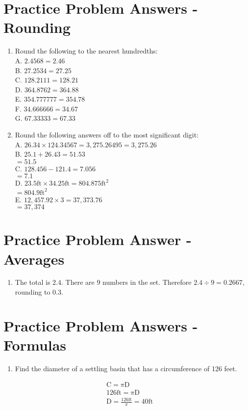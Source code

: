 \section{Practice Problem Answers - Rounding}
\begin{enumerate}
  \item Round the following to the nearest hundredths:\\
A. $2.4568=2.46$\\
B. $27.2534=27.25$\\
C. $128.2111=128.21$\\
D. $364.8762=364.88$\\
E. $354.777777=354.78$\\
F. $34.666666=34.67$\\
G. $67.33333=67.33$

  \item Round the following answers off to the most significant digit:\\
A. $26.34 \times 124.34567=3,275.26495=3,275.26$\\
B. $25.1+26.43=51.53$\\
$=51.5$\\
C. $128.456-121.4=7.056$\\
$=7.1$\\
D. $23.5 \mathrm{ft} \times 34.25 \mathrm{ft}=804.875 \mathrm{ft}^{2}$\\
$=804.9 \mathrm{ft}^{2}$\\
E. $12,457.92 \times 3=37,373.76$\\
$=37,374$

\end{enumerate}
\section{Practice Problem Answer - Averages}
\begin{enumerate}
  \item The total is $2.4$. There are 9 numbers in the set. Therefore $2.4 \div 9=0.2667$, rounding to $0.3$.
\end{enumerate}
\section{Practice Problem Answers - Formulas}
\begin{enumerate}
  \item Find the diameter of a settling basin that has a circumference of 126 feet.
\end{enumerate}
$$
\begin{aligned}
&\mathrm{C}=\pi \mathrm{D} \\
&126 \mathrm{ft}=\pi \mathrm{D} \\
&\mathrm{D}=\frac{126 \mathrm{ft}}{\pi}=40 \mathrm{ft}
\end{aligned}
$$

